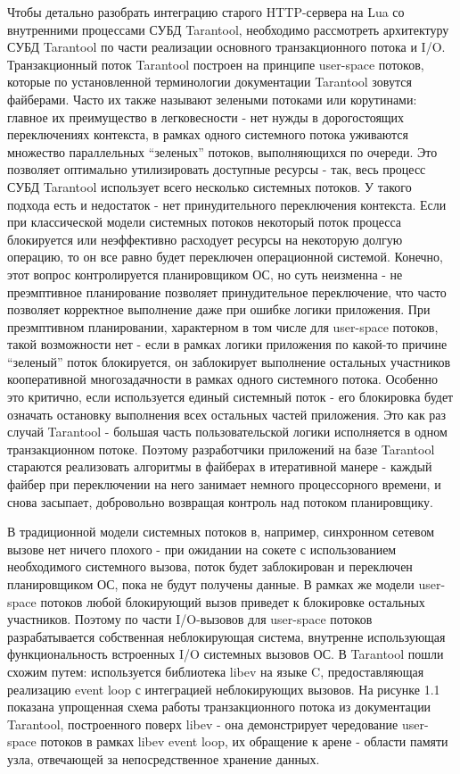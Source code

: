 \documentclass[times,numbers=noenddot]{itmo-student-thesis}
\begin{document}
Чтобы детально разобрать интеграцию старого HTTP-сервера на Lua со внутренними процессами СУБД Tarantool, необходимо рассмотреть архитектуру СУБД Tarantool по части реализации основного транзакционного потока и I/O.
Транзакционный поток Tarantool построен на принципе user-space потоков, которые по установленной терминологии документации Tarantool зовутся файберами.
Часто их также называют зелеными потоками или корутинами: главное их преимущество в легковесности - нет нужды в дорогостоящих переключениях контекста, в рамках одного системного потока уживаются множество параллельных “зеленых” потоков, выполняющихся по очереди.
Это позволяет оптимально утилизировать доступные ресурсы - так, весь процесс СУБД Tarantool использует всего несколько системных потоков.
У такого подхода есть и недостаток - нет принудительного переключения контекста.
Если при классической модели системных потоков некоторый поток процесса блокируется или неэффективно расходует ресурсы на некоторую долгую операцию, то он все равно будет переключен операционной системой.
Конечно, этот вопрос контролируется планировщиком ОС, но суть неизменна - не преэмптивное планирование позволяет принудительное переключение, что часто позволяет корректное выполнение даже при ошибке логики приложения.
При преэмптивном планировании, характерном в том числе для user-space потоков, такой возможности нет - если в рамках логики приложения по какой-то причине “зеленый” поток блокируется, он заблокирует выполнение остальных участников кооперативной многозадачности в рамках одного системного потока.
Особенно это критично, если используется единый системный поток - его блокировка будет означать остановку выполнения всех остальных частей приложения.
Это как раз случай Tarantool - большая часть пользовательской логики исполняется в одном транзакционном потоке.
Поэтому разработчики приложений на базе Tarantool стараются реализовать алгоритмы в файберах в итеративной манере - каждый файбер при переключении на него занимает немного процессорного времени, и снова засыпает, добровольно возвращая контроль над потоком планировщику.

В традиционной модели системных потоков в, например, синхронном сетевом вызове нет ничего плохого - при ожидании на сокете с использованием необходимого системного вызова, поток будет заблокирован и переключен планировщиком ОС, пока не будут получены данные.
В рамках же модели user-space потоков любой блокирующий вызов приведет к блокировке остальных участников.
Поэтому по части I/O-вызовов для user-space потоков разрабатывается собственная неблокирующая система, внутренне использующая функциональность встроенных I/O системных вызовов ОС.
В Tarantool пошли схожим путем: используется библиотека libev на языке C, предоставляющая реализацию event loop с интеграцией неблокирующих вызовов.
На рисунке 1.1 показана упрощенная схема работы транзакционного потока из документации Tarantool, построенного поверх libev - она демонстрирует чередование user-space потоков в рамках libev event loop, их обращение к арене - области памяти узла, отвечающей за непосредственное хранение данных.
\end{document}
